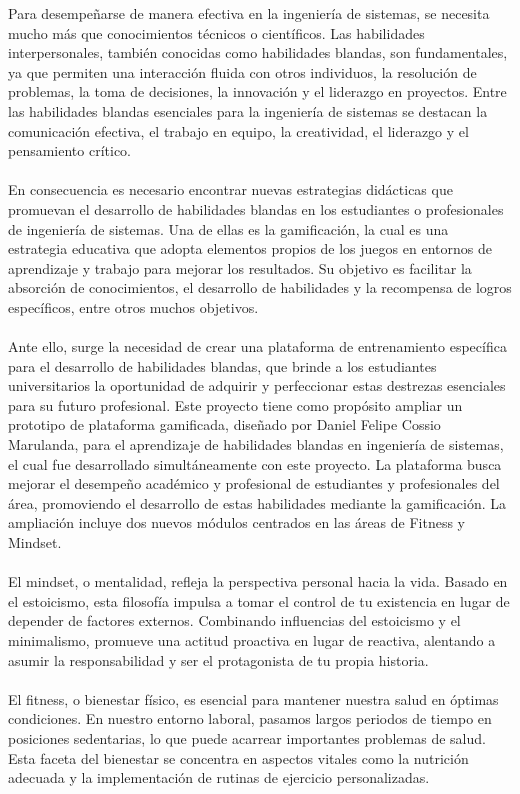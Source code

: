 Para desempeñarse de manera efectiva en la ingeniería de sistemas, se necesita mucho más que conocimientos técnicos o científicos. Las habilidades interpersonales, también conocidas como habilidades blandas, son fundamentales, ya que permiten una interacción fluida con otros individuos, la resolución de problemas, la toma de decisiones, la innovación y el liderazgo en proyectos. Entre las habilidades blandas esenciales para la ingeniería de sistemas se destacan la comunicación efectiva, el trabajo en equipo, la creatividad, el liderazgo y el pensamiento crítico.
\\ \\
En consecuencia es necesario encontrar nuevas estrategias didácticas que promuevan el desarrollo de habilidades blandas en los estudiantes o profesionales de ingeniería de sistemas. Una de ellas es la gamificación, la cual es una estrategia educativa que adopta elementos propios de los juegos en entornos de aprendizaje y trabajo para mejorar los resultados. Su objetivo es facilitar la absorción de conocimientos, el desarrollo de habilidades y la recompensa de logros específicos, entre otros muchos objetivos.\cite{b}
\\ \\
Ante ello, surge la necesidad de crear una plataforma de entrenamiento específica para el desarrollo de habilidades blandas, que brinde a los estudiantes universitarios la oportunidad de adquirir y perfeccionar estas destrezas esenciales para su futuro profesional.
Este proyecto tiene como propósito ampliar un prototipo de plataforma gamificada, diseñado por Daniel Felipe Cossio Marulanda, para el aprendizaje de habilidades blandas en ingeniería de sistemas, el cual fue desarrollado simultáneamente con este proyecto. La plataforma busca mejorar el desempeño académico y profesional de estudiantes y profesionales del área, promoviendo el desarrollo de estas habilidades mediante la gamificación. La ampliación incluye dos nuevos módulos centrados en las áreas de Fitness y Mindset.
\\ \\
El mindset, o mentalidad, refleja la perspectiva personal hacia la vida. Basado en el estoicismo, esta filosofía impulsa a tomar el control de tu existencia en lugar de depender de factores externos. Combinando influencias del estoicismo y el minimalismo, promueve una actitud proactiva en lugar de reactiva, alentando a asumir la responsabilidad y ser el protagonista de tu propia historia.
\\ \\
El fitness, o bienestar físico, es esencial para mantener nuestra salud en óptimas condiciones. En nuestro entorno laboral, pasamos largos periodos de tiempo en posiciones sedentarias, lo que puede acarrear importantes problemas de salud. Esta faceta del bienestar se concentra en aspectos vitales como la nutrición adecuada y la implementación de rutinas de ejercicio personalizadas.\cite{c}
\\ \\
